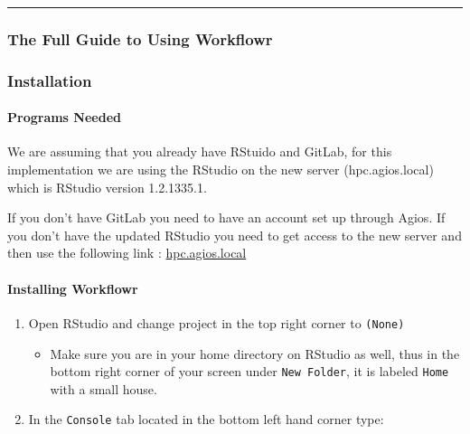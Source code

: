 \documentclass[openany]{article}
\providecommand{\tightlist}{%
  \setlength{\itemsep}{0pt}\setlength{\parskip}{0pt}}
\let\oldparagraph\paragraph
\renewcommand{\paragraph}[1]{\oldparagraph{#1}\mbox{}}
\begin{document}
\begin{center}\rule{0.5\linewidth}{\linethickness}\end{center}

\hypertarget{the-full-guide-to-using-workflowr}{%
\subsubsection*{The Full Guide to Using Workflowr}\label{the-full-guide-to-using-workflowr}}

\hypertarget{installation}{%
\subsubsection{Installation}\label{installation}}

\hypertarget{programs-needed}{%
\paragraph{Programs Needed}\label{programs-needed}}

We are assuming that you already have RStuido and GitLab, for this implementation we are using the RStudio on the new server (hpc.agios.local) which is RStudio version 1.2.1335.1.

If you don't have GitLab you need to have an account set up through Agios. If you don't have the updated RStudio you need to get access to the new server and then use the following link : \href{https://hpc.agios.local}{hpc.agios.local}

\hypertarget{installing-workflowr}{%
\paragraph{Installing Workflowr}\label{installing-workflowr}}

\begin{enumerate}
\def\labelenumi{\arabic{enumi}.}
\tightlist
\item
  Open RStudio and change project in the top right corner to \texttt{(None)}

  \begin{itemize}
  \tightlist
  \item
    Make sure you are in your home directory on RStudio as well, thus in the bottom right corner of your screen under \texttt{New\ Folder}, it is labeled \texttt{Home} with a small house.
  \end{itemize}
\item
  In the \texttt{Console} tab located in the bottom left hand corner type:
\end{enumerate}
\end{document}
